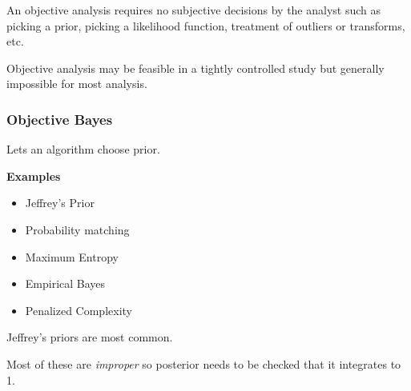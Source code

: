 \documentclass[11pt]{article}
\begin{document}
An objective analysis requires no subjective decisions by the analyst such as
picking a prior, picking a likelihood function, treatment of outliers or
transforms, etc.

Objective analysis may be feasible in a tightly controlled study but generally
impossible for most analysis.

\subsubsection{Objective Bayes}
\label{sec:orgd1aed23}

Lets an algorithm choose prior.

\textbf{Examples}
\begin{itemize}
\item Jeffrey's Prior
\item Probability matching
\item Maximum Entropy
\item Empirical Bayes
\item Penalized Complexity
\end{itemize}

Jeffrey's priors are most common.

Most of these are \emph{improper} so posterior needs to be checked that it integrates
to 1.
\end{document}
